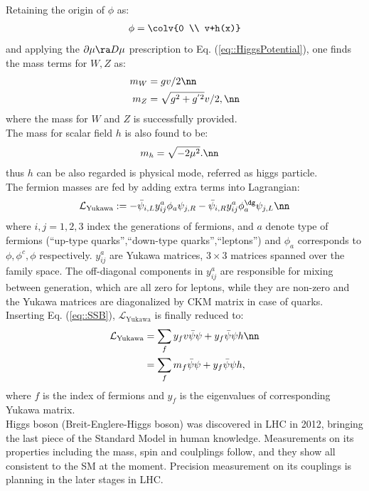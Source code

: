 Retaining the origin of $\phi$ as:
\begin{align}
\phi = \colv{0 \\ v+h(x)}
\label{eq::SSB}
\end{align}
and applying the $\partial\mu \ra D\mu$ prescription to Eq. (\ref{eq::HiggsPotential}),
one finds the mass terms for $W,Z$ as:
\begin{align}
m_W & = gv/2 \nn \\
m_Z & = \sqrt{g^2+g^{' 2}} v/2, \nn
\end{align}
where the mass for $W$ and $Z$ is successfully provided.\\

The mass for scalar field $h$ is also found to be:
\begin{align}
m_h & = \sqrt{-2\mu^2}.  \nn
\end{align}
thus $h$ can be also regarded is physical mode, referred as higgs particle. \\

The fermion masses are fed by adding extra terms into Lagrangian:
\begin{align}
\mathcal{L}_\mathrm{Yukawa} := -\bar{\psi}_{i,L} y^{a}_{ij} \phi_a \psi_{j,R} -\bar{\psi}_{i,R} y^{a}_{ij} \phi^\dg_a \psi_{j,L} \nn 
\end{align}
where $i, j=1, 2, 3$ index the generations of fermions, and $a$ denote type of fermions (``up-type quarks'',``down-type quarks'',``leptons'') and $\phi_a$ corresponds to $\phi, \phi^{c}, \phi$ respectively. $y^a_{ij}$ are Yukawa matrices, $3\times 3$ matrices spanned over the family space.
The off-diagonal components in $y^a_{ij}$ are responsible for mixing between generation, which are all zero for leptons, while they are non-zero and the Yukawa matrices are diagonalized by CKM matrix in case of quarks. \\

Inserting Eq. (\ref{eq::SSB}), $\mathcal{L}_{\mathrm{Yukawa}}$ is finally reduced to:
\begin{align}
\mathcal{L}_{\mathrm{Yukawa}} & = \sum_f y_f v \bar{\psi} \psi + y_f \bar{\psi}{\psi} h \nn \\
& = \sum_f m_f \bar{\psi} \psi + y_f \bar{\psi}{\psi} h,
\end{align}
where $f$ is the index of fermions and $y_f$ is the eigenvalues of corresponding Yukawa matrix. \\


Higgs boson (Breit-Englere-Higgs boson) was discovered in LHC in 2012, bringing the last piece of the Standard Model in human knowledge. Measurements on its properties including the mass, spin and coulplings follow, and they show all consistent to the SM at the moment. Precision measurement on its couplings is planning in the later stages in LHC.


